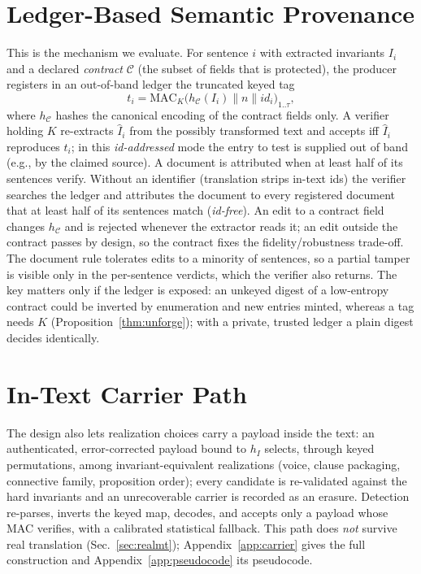 \documentclass[11pt]{article}
\begin{document}
\section{Ledger-Based Semantic Provenance}
\label{sec:ledger}
This is the mechanism we evaluate. For sentence $i$ with extracted invariants $I_i$ and a declared \emph{contract} $\mathcal{C}$ (the subset of fields that is protected), the producer registers in an out-of-band ledger the truncated keyed tag
\begin{equation}
t_i=\mathrm{MAC}_K\big(h_{\mathcal{C}}(I_i)\parallel n\parallel \mathit{id}_i\big)_{1..\tau},
\label{eq:ledgertag}
\end{equation}
where $h_{\mathcal{C}}$ hashes the canonical encoding of the contract fields only. A verifier holding $K$ re-extracts $\hat I_i$ from the possibly transformed text and accepts iff $\hat I_i$ reproduces $t_i$; in this \emph{id-addressed} mode the entry to test is supplied out of band (e.g., by the claimed source). A document is attributed when at least half of its sentences verify. Without an identifier (translation strips in-text ids) the verifier searches the ledger and attributes the document to every registered document that at least half of its sentences match (\emph{id-free}). An edit to a contract field changes $h_{\mathcal{C}}$ and is rejected whenever the extractor reads it; an edit outside the contract passes by design, so the contract fixes the fidelity/robustness trade-off. The document rule tolerates edits to a minority of sentences, so a partial tamper is visible only in the per-sentence verdicts, which the verifier also returns. The key matters only if the ledger is exposed: an unkeyed digest of a low-entropy contract could be inverted by enumeration and new entries minted, whereas a tag needs $K$ (Proposition~\ref{thm:unforge}); with a private, trusted ledger a plain digest decides identically.

\section{In-Text Carrier Path}
\label{sec:validation}\label{sec:detection}
The design also lets realization choices carry a payload inside the text: an authenticated, error-corrected payload bound to $h_I$ selects, through keyed permutations, among invariant-equivalent realizations (voice, clause packaging, connective family, proposition order); every candidate is re-validated against the hard invariants and an unrecoverable carrier is recorded as an erasure. Detection re-parses, inverts the keyed map, decodes, and accepts only a payload whose MAC verifies, with a calibrated statistical fallback. This path does \emph{not} survive real translation (Sec.~\ref{sec:realmt}); Appendix~\ref{app:carrier} gives the full construction and Appendix~\ref{app:pseudocode} its pseudocode.
\end{document}
